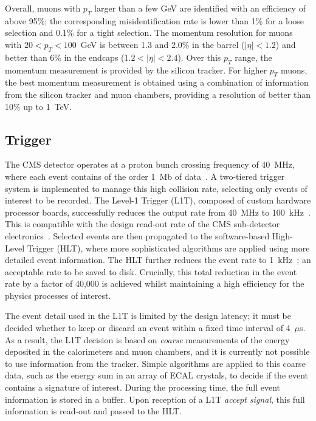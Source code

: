 Overall, muons with $p_T$ larger than a few GeV are identified with an efficiency of above 95\%; the corresponding misidentification rate is lower than 1\% for a loose selection and 0.1\% for a tight selection. The momentum resolution for muons with $20<p_T<100$~GeV is between 1.3 and 2.0\% in the barrel ($|\eta|<1.2$) and better than 6\% in the endcaps ($1.2<|\eta|<2.4$). Over this $p_T$ range, the momentum measurement is provided by the silicon tracker. For higher $p_T$ muons, the best momentum measurement is obtained using a combination of information from the silicon tracker and muon chambers, providing a resolution of better than 10\% up to 1~TeV.

\subsection{Trigger}\label{sec:trigger}
The CMS detector operates at a proton bunch crossing frequency of 40~MHz, where each event contains of the order 1~Mb of data~\cite{}. A two-tiered trigger system is implemented to manage this high collision rate, selecting only events of interest to be recorded. The Level-1 Trigger (L1T), composed of custom hardware processor boards, successfully reduces the output rate from 40~MHz to 100~kHz~\cite{}. This is compatible with the design read-out rate of the CMS sub-detector electronics~\cite{}. Selected events are then propagated to the software-based High-Level Trigger (HLT), where more sophisticated algorithms are applied using more detailed event information. The HLT further reduces the event rate to 1~kHz~\cite{}; an acceptable rate to be saved to disk. Crucially, this total reduction in the event rate by a factor of 40,000 is achieved whilst maintaining a high efficiency for the physics processes of interest.

The event detail used in the L1T is limited by the design latency; it must be decided whether to keep or discard an event within a fixed time interval of 4~$\mu$s. As a result, the L1T decision is based on \textit{coarse} measurements of the energy deposited in the calorimeters and muon chambers, and it is currently not possible to use information from the tracker. Simple algorithms are applied to this coarse data, such as the energy sum in an array of ECAL crystals, to decide if the event contains a signature of interest. During the processing time, the full event information is stored in a buffer. Upon reception of a L1T \textit{accept signal}, this full information is read-out and passed to the HLT.

